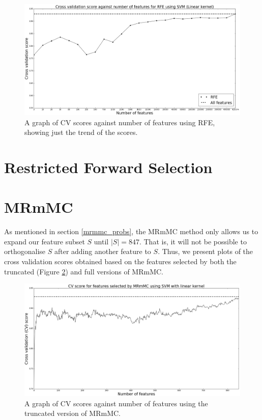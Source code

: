 \documentclass[12pt, twoside, a4paper]{report}
\begin{document}
\begin{figure}
\centering
\includegraphics[width=\textwidth]{images/rfe_linear.jpeg}
\caption{A graph of CV scores against number of features using RFE, showing just the trend of the scores.}
\label{body:rfe:graph_1}
\end{figure}

\section{Restricted Forward Selection}

\section{MRmMC}

As mentioned in section \ref{mrmmc_probs}, the MRmMC method only allows us to expand our feature subset $S$ until $|S|=847$. That is, it will not be possible to orthogonalise $S$ after adding another feature to $S$. Thus, we present plots of the cross validation scores obtained based on the features selected by both the truncated (Figure \ref{body:mrmmc_trun}) and full versions of MRmMC.

\begin{figure}
\centering
\includegraphics[width=\textwidth]{images/mrmmc_linear_847.jpeg}
\caption{A graph of CV scores against number of features using the truncated version of MRmMC.}
\label{body:mrmmc_trun}
\end{figure}
\end{document}

